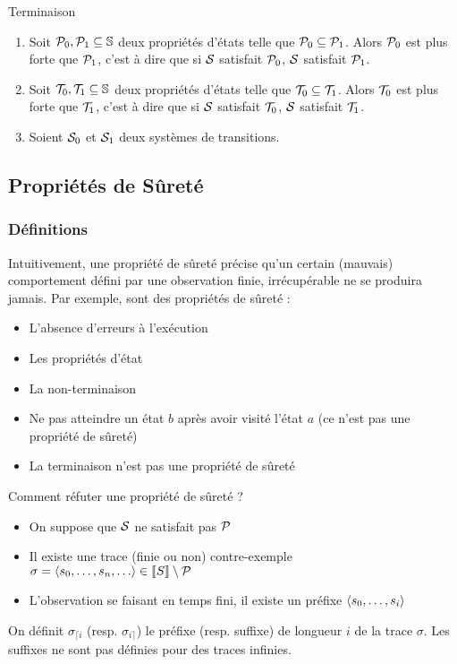 \documentclass{cours}
\begin{document}
\begin{propositionfr}{Terminaison}{}
    \begin{enumerate}
        \item Soit $\mathcal{P}_{0}, \mathcal{P}_{1} \subseteq \mathbb{S}$ deux propriétés d'états telle que $\mathcal{P}_{0} \subseteq \mathcal{P}_{1}$. Alors $\mathcal{P}_{0}$ est plus forte que $\mathcal{P}_{1}$, c'est à dire que si $\mathcal{S}$ satisfait $\mathcal{P}_{0}$, $\mathcal{S}$ satisfait $\mathcal{P}_{1}$.
        \item Soit $\mathcal{T}_{0}, \mathcal{T}_{1} \subseteq \mathbb{S}$ deux propriétés d'états telle que $\mathcal{T}_{0} \subseteq \mathcal{T}_{1}$. Alors $\mathcal{T}_{0}$ est plus forte que $\mathcal{T}_{1}$, c'est à dire que si $\mathcal{S}$ satisfait $\mathcal{T}_{0}$, $\mathcal{S}$ satisfait $\mathcal{T}_{1}$.
        \item Soient $\mathcal{S}_{0}$ et $\mathcal{S}_{1}$ deux systèmes de transitions. 
    \end{enumerate}
\end{propositionfr}

\subsection{Propriétés de Sûreté}
\subsubsection{Définitions}
Intuitivement, une propriété de sûreté précise qu'un certain (mauvais) comportement défini par une observation finie, irrécupérable ne se produira jamais. Par exemple, sont des propriétés de sûreté :
\begin{itemize}
    \item L'absence d'erreurs à l'exécution
    \item Les propriétés d'état
    \item La non-terminaison
    \item Ne pas atteindre un état $b$ après avoir visité l'état $a$ (ce n'est pas une propriété de sûreté)
    \item La terminaison n'est pas une propriété de sûreté
\end{itemize}
Comment réfuter une propriété de sûreté ? 
\begin{itemize}
    \item On suppose que $\mathcal{S}$ ne satisfait pas $\mathcal{P}$
    \item Il existe une trace  (finie ou non) contre-exemple $\sigma = \left\langle s_{0}, \ldots, s_{n}, \ldots \right\rangle \in \left\llbracket S \right\rrbracket\setminus \mathcal{P}$
    \item L'observation se faisant en temps fini, il existe un préfixe $\left\langle s_{0}, \ldots, s_{i} \right\rangle$
\end{itemize}
On définit $\sigma_{\lceil i}$ (resp. $\sigma_{i \rceil}$) le préfixe (resp. suffixe) de longueur $i$ de la trace $\sigma$. Les suffixes ne sont pas définies pour des traces infinies.
\end{document}
